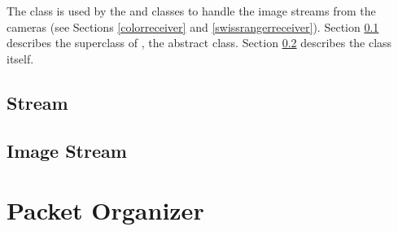 	The \ImageStream{} class is used by the \ColorReceiver{} and \SwissRangerReceiver{}  classes to 
	handle the image streams from the cameras (see Sections \ref{colorreceiver} and 
	\ref{swissrangerreceiver}). Section \ref{stream} describes the superclass of \ImageStream{}, the 
	\Stream{} abstract class. Section \ref{imagestream2} describes the \ImageStream{} class itself.

	\subsection{Stream} \label{stream}
	
	\subsection{Image Stream} \label{imagestream2}
	
	
\section{Packet Organizer} \label{packetorganizer}
